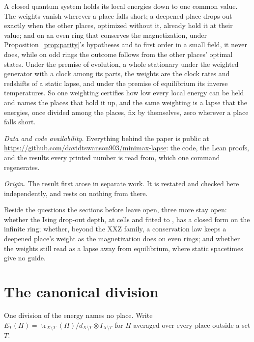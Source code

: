 \documentclass[aps,prd,reprint,superscriptaddress]{revtex4-2}
\begin{document}
A closed quantum system holds its local energies down to one common value. The weights vanish wherever a place falls short; a deepened place drops out exactly when the other places, optimized without it, already hold it at their value; and on an even ring that conserves the magnetization, under Proposition~\ref{prop:parity}'s hypotheses and to first order in a small field, it never does, while on odd rings the outcome follows from the other places' optimal states. Under the premise of evolution, a whole stationary under the weighted generator with a clock among its parts, the weights are the clock rates and redshifts of a static lapse, and under the premise of equilibrium its inverse temperatures. So one weighting certifies how low every local energy can be held and names the places that hold it up, and the same weighting is a lapse that the energies, once divided among the places, fix by themselves, zero wherever a place falls short.

\textit{Data and code availability.} Everything behind the paper is public at \url{https://github.com/davidtswanson903/minimax-lapse}: the code, the Lean proofs, and the results every printed number is read from, which one command regenerates.

\textit{Origin.} The result first arose in separate work. It is restated and checked here independently, and rests on nothing from there.

Beside the questions the sections before leave open, three more stay open: whether the Ising drop-out depth,  at  cells and fitted to , has a closed form on the infinite ring; whether, beyond the XXZ family, a conservation law keeps a deepened place's weight as the magnetization does on even rings; and whether the weights still read as a lapse away from equilibrium, where static spacetimes give no guide.

\appendix

\section{The canonical division}
\label{app:division}

One division of the energy names no place. Write $E_T(H) = \operatorname{tr}_{X\setminus T}(H)/d_{X\setminus T} \otimes I_{X\setminus T}$ for $H$ averaged over every place outside a set $T$.
\end{document}
